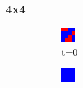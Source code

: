 \documentclass[a4paper, 11pt]{article}
\begin{document}
\subsubsection{4x4}
\begin{figure}[H]
\centering
\begin{subfigure}{.16\textwidth}
  \centering
  \includegraphics[width=0.9\linewidth]{PRISONERS_DILEMMA_MOORE_4x4_t00}
  \caption{t=0}
\end{subfigure}%
\begin{subfigure}{.16\textwidth}
  \centering
  \includegraphics[width=0.9\linewidth]{PRISONERS_DILEMMA_MOORE_4x4_t01}

\end{subfigure}
\end{figure}
\end{document}
